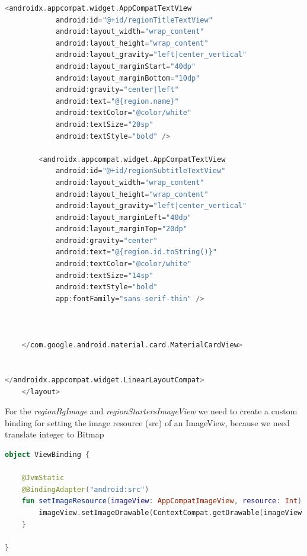 \documentclass[a4paper, 12pt]{article}
\begin{document}
\begin{lstlisting}[caption={Navigation with Region Fragment.}, label={code:nav_region_code}, language=Kotlin]
        <androidx.appcompat.widget.AppCompatTextView
            android:id="@+id/regionTitleTextView"
            android:layout_width="wrap_content"
            android:layout_height="wrap_content"
            android:layout_gravity="left|center_vertical"
            android:layout_marginStart="40dp"
            android:layout_marginBottom="10dp"
            android:gravity="center|left"
            android:text="@{region.name}"
            android:textColor="@color/white"
            android:textSize="20sp"
            android:textStyle="bold" />

        <androidx.appcompat.widget.AppCompatTextView
            android:id="@+id/regionSubtitleTextView"
            android:layout_width="wrap_content"
            android:layout_height="wrap_content"
            android:layout_gravity="left|center_vertical"
            android:layout_marginLeft="40dp"
            android:layout_marginTop="20dp"
            android:gravity="center"
            android:text="@{region.id.toString()}"
            android:textColor="@color/white"
            android:textSize="14sp"
            android:textStyle="bold"
            app:fontFamily="sans-serif-thin" />



    </com.google.android.material.card.MaterialCardView>


</androidx.appcompat.widget.LinearLayoutCompat>
    </layout>
\end{lstlisting}

For the  \textit{regionBgImage} and \textit{regionStartersImageView} we need to create a custom binding for setting the image resource (src) of an ImageView, because we need translate integer to Bitmap 

\begin{lstlisting}[caption={Navigation with Region Fragment.}, label={code:nav_region_code}, language=Kotlin]
    object ViewBinding {

    @JvmStatic
    @BindingAdapter("android:src")
    fun setImageResource(imageView: AppCompatImageView, resource: Int) {
        imageView.setImageDrawable(ContextCompat.getDrawable(imageView.context,resource))
    }

}
\end{lstlisting}
\end{document}

